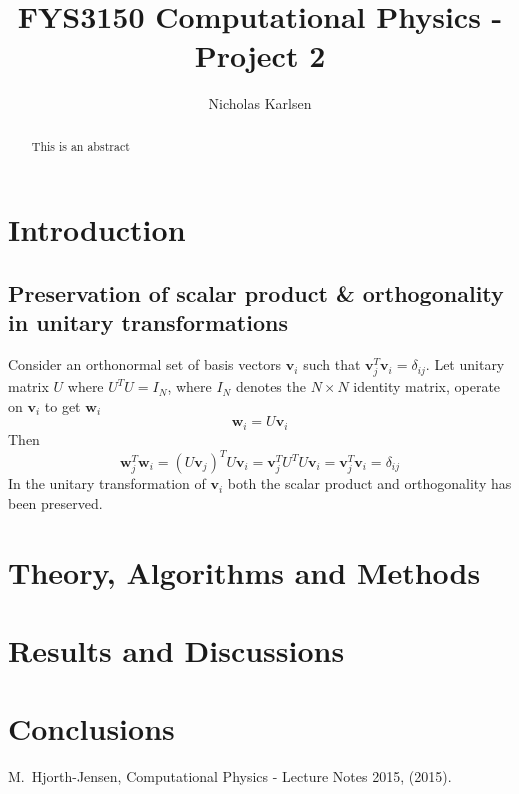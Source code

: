 \documentclass[10pt,showpacs,preprintnumbers,footinbib,amsmath,amssymb,aps,prl,twocolumn,groupedaddress,superscriptaddress,showkeys]{revtex4-1}
\begin{document}
\title{FYS3150 Computational Physics - Project 2}
\author{Nicholas Karlsen}

\begin{abstract}
  This is an abstract
\end{abstract}

\maketitle

\section{Introduction}
  \subsection{Preservation of scalar product \& orthogonality in unitary transformations}
    Consider an orthonormal set of basis vectors $\mathbf v_i$ such that $\mathbf v_j^T \mathbf v_i = \delta_{ij}$. Let unitary matrix $U$ where $U^T U= I_N$, where $I_N$ denotes the $N\times N$ identity matrix, operate on $\mathbf v_i$ to get $\mathbf w_i$
    \begin{equation}
      \mathbf w_i = U \mathbf v_i
    \end{equation}
    Then
    \begin{equation}
      \mathbf w_j^T\mathbf w_i = (U\mathbf v_j)^TU\mathbf v_i = \mathbf v_j^T U^T U \mathbf v_i
      = \mathbf v_j^T \mathbf v_i = \delta_{ij}
    \end{equation}
    In the unitary transformation of $\mathbf v_i$ both the scalar product and orthogonality has been preserved.
\section{Theory, Algorithms and Methods}
\section{Results and Discussions}
\section{Conclusions}

 

\begin{thebibliography}{99}
 M.~Hjorth-Jensen, Computational Physics - Lecture Notes 2015, (2015).
\end{thebibliography}
\end{document}
